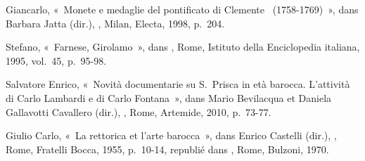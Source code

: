 \begin{teiElement}[name={TEI},change={commons\_edition}]
\begin{teiElement}[name={text},type={book},xmlid={book}]
\begin{teiElement}[name={group},type={book},xmlid={book-001}]
\begin{teiElement}[name={group},type={bibliography},data-page-title={Sources et bibliographie},data-include-href={Ch14\_Source\_bibliographie.xml},xmlid={bibliography-001}]
\begin{teiElement}[name={body}]
\begin{teiDiv}[type={section1},xmlid={section1-041}]
\begin{teiDiv}[type={section2},xmlid={div17}]
\end{teiDiv}
          
\end{teiDiv}
          \begin{teiDiv}[type={section1},xmlid={div18}]

            \begin{teiDiv}[type={section2},xmlid={div19}]

              \begin{teiBibl}[xmlid={bibl-319}]
 Giancarlo, « Monete e medaglie del pontificato di Clemente  (1758-1769) », dans Barbara Jatta (dir.), , Milan, Electa, 1998, p. 204.
\end{teiBibl}
              \begin{teiBibl}[xmlid={bibl-320}]
 Stefano, « Farnese, Girolamo », dans , Rome, Istituto della Enciclopedia italiana, 1995, vol. 45, p. 95-98.
\end{teiBibl}
              \begin{teiBibl}[xmlid={bibl-321}]
 Salvatore Enrico, « Novità documentarie su S. Prisca in età barocca. L’attività di Carlo Lambardi e di Carlo Fontana », dans Mario Bevilacqua et Daniela Gallavotti Cavallero (dir.), , Rome, Artemide, 2010, p. 73-77.
\end{teiBibl}
              \begin{teiBibl}[xmlid={bibl-322}]
 Giulio Carlo, « La rettorica et l’arte barocca », dans Enrico Castelli (dir.), , Rome, Fratelli Bocca, 1955, p. 10-14, republié dans , Rome, Bulzoni, 1970.
\end{teiBibl}
              \begin{teiBibl}[xmlid={bibl-323}]

\end{teiBibl}
\end{teiDiv}
\end{teiDiv}
\end{teiElement}
\end{teiElement}
\end{teiElement}
\end{teiElement}
\end{teiElement}
